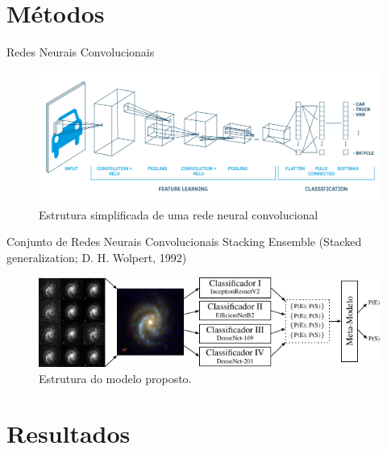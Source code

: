 \documentclass[10pt,xcolor=svgnames]{beamer}
\begin{document}
{
\AtBeginSection{}
\section{Métodos}
}

\begin{frame}{Redes Neurais Convolucionais}
  \begin{figure}
    \includegraphics[width=\linewidth]{fig/convnet.png}
    \caption{Estrutura simplificada de uma rede neural convolucional}
  \end{figure}
\end{frame}

\begin{frame}{Conjunto de Redes Neurais Convolucionais}
  Stacking Ensemble (Stacked generalization; D. H. Wolpert, 1992)
  \vspace{2mm}

  \begin{figure}
    \includegraphics[width=\linewidth]{figures/arch.pdf}
    \caption{Estrutura do modelo proposto.}
  \end{figure}
\end{frame}


{
\AtBeginSection{}
\section{Resultados}
}
\end{document}
